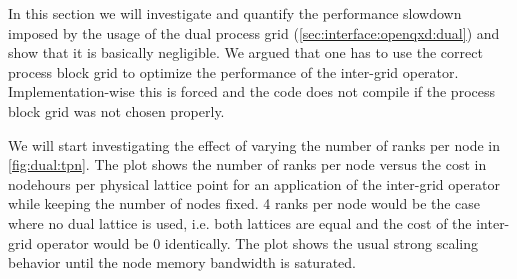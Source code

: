 In this section we will investigate and quantify the performance slowdown imposed by the usage of the dual process grid (\cref{sec:interface:openqxd:dual}) and show that it is basically negligible.
We argued that one has to use the correct process block grid to optimize the performance of the inter-grid operator.
Implementation-wise this is forced and the code does not compile if the process block grid was not chosen properly.

We will start investigating the effect of varying the number of ranks per node in \cref{fig:dual:tpn}.
The plot shows the number of ranks per node versus the cost in nodehours per physical lattice point for an application of the inter-grid operator while keeping the number of nodes fixed.
\num{4} ranks per node would be the case where no dual lattice is used, i.e. both lattices are equal and the cost of the inter-grid operator would be \num{0} identically.
The plot shows the usual strong scaling behavior until the node memory bandwidth is saturated.

